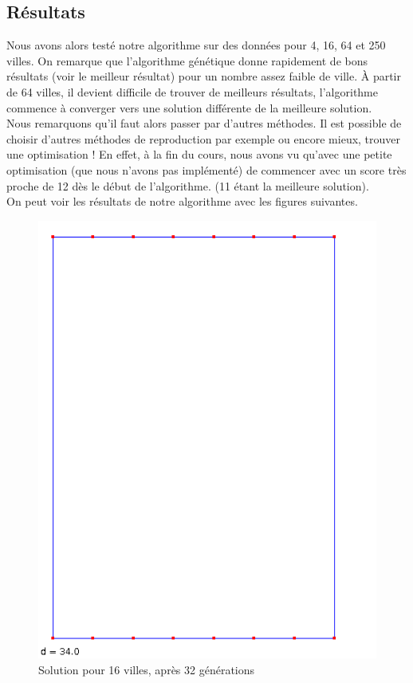 \documentclass{article}
\begin{document}
\subsection{Résultats}
Nous avons alors testé notre algorithme sur des données pour 4, 16, 64 et 250 villes. On remarque que l'algorithme génétique donne rapidement de bons résultats (voir le meilleur résultat) pour un nombre assez faible de ville. À partir de 64 villes, il devient difficile de trouver de meilleurs résultats, l'algorithme commence à converger vers une solution différente de la meilleure solution.\\
Nous remarquons qu'il faut alors passer par d'autres méthodes. Il est possible de choisir d'autres méthodes de reproduction par exemple ou encore mieux, trouver une optimisation ! En effet, à la fin du cours, nous avons vu qu'avec une petite optimisation (que nous n'avons pas implémenté) de commencer avec un score très proche de 12 dès le début de l'algorithme. (11 étant la meilleure solution).\\
On peut voir les résultats de notre algorithme avec les figures suivantes.\\
\begin{figure}
	\begin{center}
		\includegraphics[scale=0.7]{images/16-32gen}\\
		Solution pour 16 villes, après 32 générations
	\end{center}
\end{figure}
\end{document}
